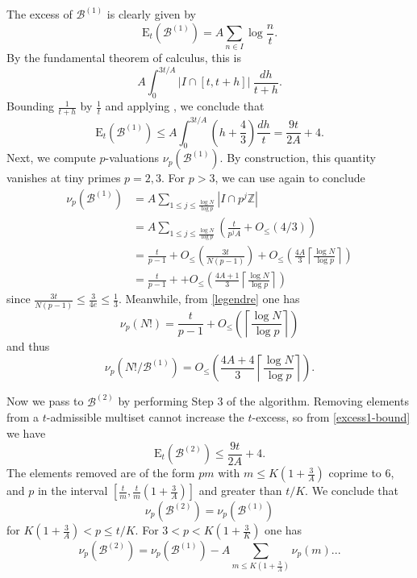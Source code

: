 \documentclass[12pt,a4paper,reqno]{amsart}
\numberwithin{equation}{section}
\theoremstyle{plain}
\theoremstyle{definition}
\newcommand\Z{\mathbb{Z}}
\newcommand\tuple{{\mathcal B}}
\newcommand\excess{{\mathrm{E}}}
\begin{document}
The excess of $\tuple^{(1)}$ is clearly given by
$$ \excess_t(\tuple^{(1)}) = A \sum_{n \in I} \log \frac{n}{t}.$$
By the fundamental theorem of calculus, this is
$$ A \int_0^{3t/A} |I \cap [t, t+h]|\ \frac{dh}{t+h}.$$
Bounding $\frac{1}{t+h}$ by $\frac{1}{t}$ and applying , we conclude that
\begin{equation}\label{excess1-bound}
 \excess_t(\tuple^{(1)}) \leq A \int_0^{3t/A} \left(h + \frac{4}{3}\right) \frac{dh}{t} = \frac{9t}{2A} + 4.
\end{equation}
Next, we compute $p$-valuations $\nu_p(\tuple^{(1)})$.  By construction, this quantity vanishes at tiny primes $p=2,3$.  For $p>3$, we can use  again to conclude
\begin{align*}
  \nu_p(\tuple^{(1)}) &= A \sum_{1 \leq j \leq \frac{\log N}{\log p}} |I \cap p^j \Z| \\
  &= A \sum_{1 \leq j \leq \frac{\log N}{\log p}} \left(\frac{t}{p^j A} + O_{\leq}(4/3)\right) \\
  &= \frac{t}{p-1} + O_{\leq}\left(\frac{3t}{N(p-1)}\right)
  + O_{\leq}\left(\frac{4A}{3} \left\lceil \frac{\log N}{\log p}  \right\rceil\right) \\
  &= \frac{t}{p-1} +
  + O_{\leq}\left(\frac{4A+1}{3} \left\lceil \frac{\log N}{\log p}  \right\rceil\right) 
\end{align*}
since $\frac{3t}{N(p-1)} \leq \frac{3}{4e} \leq \frac{1}{3}$.
Meanwhile, from \eqref{legendre} one has
$$ \nu_p(N!) = \frac{t}{p-1} + O_{\leq}\left(\left\lceil \frac{\log N}{\log p}  \right\rceil\right)$$
and thus
\begin{equation}\label{nup} 
  \nu_p(N!/\tuple^{(1)}) =  
O_{\leq}\left(\frac{4A+4}{3} \left\lceil \frac{\log N}{\log p}  \right\rceil\right).
\end{equation}

Now we pass to $\tuple^{(2)}$ by performing Step 3 of the algorithm.  Removing elements from a $t$-admissible multiset cannot increase the $t$-excess, so from \eqref{excess1-bound} we have
\begin{equation}\label{excess2-bound} 
  \excess_t(\tuple^{(2)}) \leq \frac{9t}{2A} + 4.
\end{equation}
The elements removed are of the form $pm$ with $m \leq K(1+\frac{3}{A})$ coprime to $6$, and $p$ in the interval $[\frac{t}{m}, \frac{t}{m}(1+\frac{3}{A})]$ and greater than $t/K$.  We conclude that
$$ \nu_p( \tuple^{(2)} ) = \nu_p( \tuple^{(1)})$$
for $K(1+\frac{3}{A}) < p \leq t/K$.  For $3 < p < K(1+\frac{3}{K})$ one has
$$ \nu_p( \tuple^{(2)} ) = \nu_p(\tuple^{(1)}) - A \sum_{m \leq K(1+\frac{3}{A})} \nu_p(m) ...$$
\end{document}
